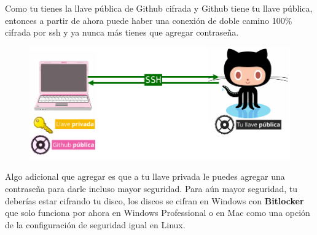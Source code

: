 \documentclass{article}
\begin{document}
Como tu tienes la llave pública de Github cifrada y Github tiene tu llave
pública, entonces a partir de ahora puede haber una conexión de doble camino
100\% cifrada por ssh y ya nunca más tienes que agregar contraseña.

\begin{figure}[h!]
  \centering
  \includegraphics[scale=0.5]{./Pictures/218_pull_ssh.png}
\end{figure}

Algo adicional que agregar es que a tu llave privada le puedes agregar una
contraseña para darle incluso mayor seguridad. Para aún mayor seguridad, tu
deberías estar cifrando tu disco, los discos se cifran en Windows con
\textbf{Bitlocker} que solo funciona por ahora en Windows Professional o en Mac
como una opción de la configuración de seguridad igual en Linux.\\

%
%
%
%
%
%
\end{document}
